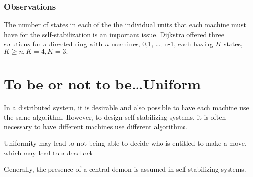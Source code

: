 
\subsubsection{Observations}

The number of states in each of the the individual units that each machine must have for the self-stabilization is an important issue. Dijkstra offered three solutions for a directed ring with $n$ machines, 0,1, \dots, n-1, each having $K$ states, $K \geq n, K=4, K=3.$


\section{To be or not to be\dots Uniform}
In a distributed system, it is desirable and also possible to have each machine use the same algorithm.
However, to design self-stabilizing systems, it is often necessary to have different machines use different algorithms.

Uniformity may lead to not being able to decide who is entitled to make a move, which may lead to a deadlock.
\nl

Generally, the presence of a central demon is assumed in self-stabilizing systems.
